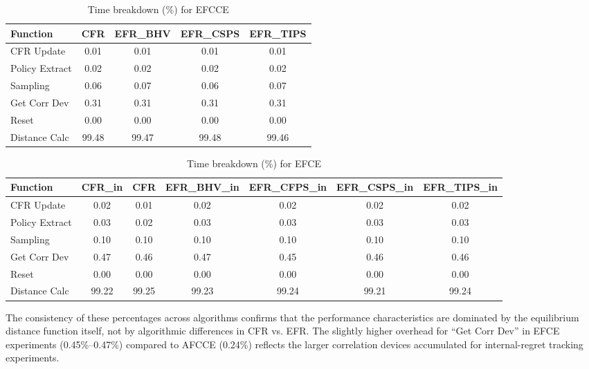 \documentclass[11pt]{article}
\begin{document}
\begin{table}[H]
\centering
\caption{Time breakdown (\%) for EFCCE}
\label{tab:efcce_breakdown}
\begin{tabular}{lcccc}
\toprule
Function & CFR & EFR\_BHV & EFR\_CSPS & EFR\_TIPS \\
\midrule
CFR Update & 0.01 & 0.01 & 0.01 & 0.01 \\
Policy Extract & 0.02 & 0.02 & 0.02 & 0.02 \\
Sampling & 0.06 & 0.07 & 0.06 & 0.07 \\
Get Corr Dev & 0.31 & 0.31 & 0.31 & 0.31 \\
Reset & 0.00 & 0.00 & 0.00 & 0.00 \\
Distance Calc & 99.48 & 99.47 & 99.48 & 99.46 \\
\bottomrule
\end{tabular}
\end{table}

\begin{table}[H]
\centering
\caption{Time breakdown (\%) for EFCE}
\label{tab:efce_breakdown}
\begin{tabular}{lcccccc}
\toprule
Function & CFR\_in & CFR & EFR\_BHV\_in & EFR\_CFPS\_in & EFR\_CSPS\_in & EFR\_TIPS\_in \\
\midrule
CFR Update & 0.02 & 0.01 & 0.02 & 0.02 & 0.02 & 0.02 \\
Policy Extract & 0.03 & 0.02 & 0.03 & 0.03 & 0.03 & 0.03 \\
Sampling & 0.10 & 0.10 & 0.10 & 0.10 & 0.10 & 0.10 \\
Get Corr Dev & 0.47 & 0.46 & 0.47 & 0.45 & 0.46 & 0.46 \\
Reset & 0.00 & 0.00 & 0.00 & 0.00 & 0.00 & 0.00 \\
Distance Calc & 99.22 & 99.25 & 99.23 & 99.24 & 99.21 & 99.24 \\
\bottomrule
\end{tabular}
\end{table}

The consistency of these percentages across algorithms confirms that the performance characteristics are dominated by the equilibrium distance function itself, not by algorithmic differences in CFR vs. EFR. The slightly higher overhead for ``Get Corr Dev'' in EFCE experiments (0.45\%--0.47\%) compared to AFCCE (0.24\%) reflects the larger correlation devices accumulated for internal-regret tracking experiments.
\end{document}
